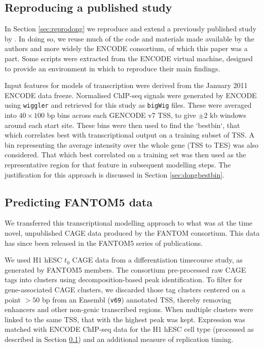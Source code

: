 \documentclass[a4paper,11pt,oneside]{book}
\begin{document}
\subsection{Reproducing a published study}\label{meth:dong}
In Section \ref{sec:reprodong} we reproduce and extend a previously published study by \citet{Dong2012}. In doing so, we reuse much of the code and materials made available by the authors and more widely the ENCODE consortium\cite{Dunham2012}, of which this paper was a part. Some scripts were extracted from the ENCODE virtual machine, designed to provide an environment in which to reproduce their main findings.\cite{Myers2011}

Input features for models of transcription were derived from the January 2011 ENCODE data freeze.\cite{Dunham2012} Normalised ChIP-seq signals were generated by ENCODE using \texttt{wiggler} and retrieved for this study as \texttt{bigWig} files. These were averaged into $40 \times 100$ bp bins across each GENCODE v7 TSS, to give $\pm 2$ kb windows around each start site. These bins were then used to find the `bestbin`, that which correlates best with transcriptional output on a training subset of TSS. A bin representing the average intensity over the whole gene (TSS to TES) was also considered. That which best correlated on a training set was then used as the representative region for that feature in subsequent modelling steps.\cite{Dong2012} The justification for this approach is discussed in Section \ref{sec:dongbestbin}.

\subsection{Predicting FANTOM5 data}\label{meth:fantom5}

We transferred this transcriptional modelling approach to what was at the time novel, unpublished CAGE data produced by the FANTOM consortium. This data has since been released in the FANTOM5 series of publications.\cite{fantom5}

We used H1 hESC $t_0$ CAGE data from a differentiation timecourse study, as generated by FANTOM5 members. The consortium pre-processed raw CAGE tags into clusters using decomposition-based peak identification.\cite{fantom5} To filter for gene-associated CAGE clusters, we discarded those tag clusters centered on a point $>50$ bp from an Ensembl (\texttt{v69}) annotated TSS, thereby removing enhancers and other non-genic transcribed regions. When multiple clusters were linked to the same TSS, that with the highest peak was kept. Expression was matched with ENCODE ChIP-seq data for the H1 hESC cell type (processed as described in Section \ref{meth:dong}) and an additional measure of replication timing. 
\end{document}
